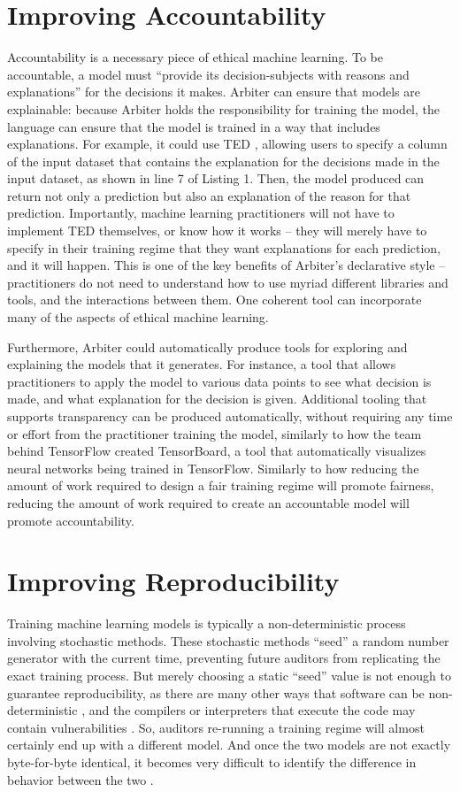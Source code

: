 \documentclass[letterpaper]{article}
\newcommand{\citep}[1]{\cite{#1}}
\begin{document}
\section{Improving Accountability}
Accountability is a necessary piece of ethical machine learning. To be accountable, a model must ``provide its decision-subjects with reasons and explanations'' \citep{Binns2017} for the decisions it makes. Arbiter can ensure that models are explainable: because Arbiter holds the responsibility for training the model, the language can ensure that the model is trained in a way that includes explanations. For example, it could use TED \citep{Hind2019}, allowing users to specify a column of the input dataset that contains the explanation for the decisions made in the input dataset, as shown in line 7 of Listing 1. Then, the model produced can return not only a prediction but also an explanation of the reason for that prediction. Importantly, machine learning practitioners will not have to implement TED themselves, or know how it works -- they will merely have to specify in their training regime that they want explanations for each prediction, and it will happen. This is one of the key benefits of Arbiter's declarative style -- practitioners do not need to understand how to use myriad different libraries and tools, and the interactions between them. One coherent tool can incorporate many of the aspects of ethical machine learning.

Furthermore, Arbiter could automatically produce tools for exploring and explaining the models that it generates. For instance, a tool that allows practitioners to apply the model to various data points to see what decision is made, and what explanation for the decision is given. Additional tooling that supports transparency can be produced automatically, without requiring any time or effort from the practitioner training the model, similarly to how the team behind TensorFlow created TensorBoard, a tool that automatically visualizes neural networks being trained in TensorFlow. Similarly to how reducing the amount of work required to design a fair training regime will promote fairness, reducing the amount of work required to create an accountable model will promote accountability. 

\section{Improving Reproducibility}
Training machine learning models is typically a non-deterministic process involving stochastic methods. These stochastic methods ``seed'' a random number generator with the current time, preventing future auditors from replicating the exact training process. But merely choosing a static ``seed'' value is not enough to guarantee reproducibility, as there are many other ways that software can be non-deterministic \citep{Maste2017}, and the compilers or interpreters that execute the code may contain vulnerabilities \citep{Thompson1984}. So, auditors re-running a training regime will almost certainly end up with a different model. And once the two models are not exactly byte-for-byte identical, it becomes very difficult to identify the difference in behavior between the two \citep{Perry2014}.
\end{document}
